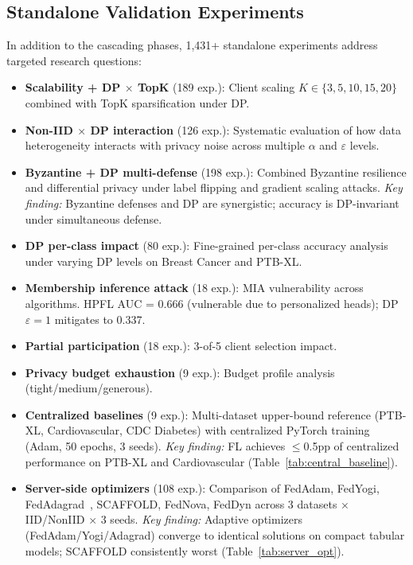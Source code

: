 \documentclass[conference]{IEEEtran}
\begin{document}
\subsection{Standalone Validation Experiments}

In addition to the cascading phases, 1,431+ standalone experiments address targeted research questions:

\begin{itemize}
    \item \textbf{Scalability + DP $\times$ TopK} (189 exp.): Client scaling $K{\in}\{3, 5, 10, 15, 20\}$ combined with TopK sparsification under DP.
    \item \textbf{Non-IID $\times$ DP interaction} (126 exp.): Systematic evaluation of how data heterogeneity interacts with privacy noise across multiple $\alpha$ and $\varepsilon$ levels.
    \item \textbf{Byzantine + DP multi-defense} (198 exp.): Combined Byzantine resilience and differential privacy under label flipping and gradient scaling attacks. \textit{Key finding:} Byzantine defenses and DP are synergistic; accuracy is DP-invariant under simultaneous defense.
    \item \textbf{DP per-class impact} (80 exp.): Fine-grained per-class accuracy analysis under varying DP levels on Breast Cancer and PTB-XL.
    \item \textbf{Membership inference attack} (18 exp.): MIA vulnerability across algorithms. HPFL AUC = 0.666 (vulnerable due to personalized heads); DP $\varepsilon{=}1$ mitigates to 0.337.
    \item \textbf{Partial participation} (18 exp.): 3-of-5 client selection impact.
    \item \textbf{Privacy budget exhaustion} (9 exp.): Budget profile analysis (tight/medium/generous).
    \item \textbf{Centralized baselines} (9 exp.): Multi-dataset upper-bound reference (PTB-XL, Cardiovascular, CDC Diabetes) with centralized PyTorch training (Adam, 50 epochs, 3 seeds). \textit{Key finding:} FL achieves $\leq$0.5pp of centralized performance on PTB-XL and Cardiovascular (Table~\ref{tab:central_baseline}).
    \item \textbf{Server-side optimizers} (108 exp.): Comparison of FedAdam, FedYogi, FedAdagrad~\cite{reddi2021adaptive}, SCAFFOLD, FedNova, FedDyn across 3 datasets $\times$ IID/NonIID $\times$ 3 seeds. \textit{Key finding:} Adaptive optimizers (FedAdam/Yogi/Adagrad) converge to identical solutions on compact tabular models; SCAFFOLD consistently worst (Table~\ref{tab:server_opt}).

\end{itemize}
\end{document}

